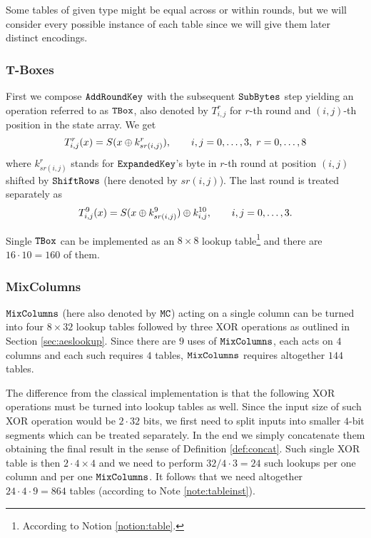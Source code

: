 \begin{note}
\label{note:tableinst}
	Some tables of given type might be equal across or within rounds, but we will consider every possible instance of each table since we will give them later distinct encodings.
\end{note}

\subsubsection{T-Boxes}
	
	First we compose $\texttt{AddRoundKey}$ with the subsequent $\texttt{SubBytes}$ step yielding an operation referred to as $\texttt{TBox}$, also denoted by $T_{i,j}^r$ for $r$-th round and $(i,j)$-th position in the state array. We get
	\begin{equation}
		T_{i,j}^r(x) = S(x\oplus k_{sr(i,j)}^r) , \qquad i,j=0 , \ldots , 3,\;r=0 , \ldots , 8
	\end{equation}
	where $k_{sr(i,j)}^r$ stands for $\texttt{ExpandedKey}$'s byte in $r$-th round at position $(i,j)$ shifted by $\texttt{ShiftRows}$ (here denoted by $sr(i,j)$). The last round is treated separately as
	\begin{equation}
	\label{eq:lasttbox}
		T_{i,j}^{9}(x) = S(x\oplus k_{sr(i,j)}^9) \oplus k_{i,j}^{10} , \qquad i,j=0 , \ldots , 3 .
	\end{equation}
	
	Single $\texttt{TBox}$ can be implemented as an $8\times 8$ lookup table\footnote{According to Notion \ref{notion:table}.} and there are $16\cdot 10 = 160$ of them.

\subsubsection{MixColumns}
	
	$\texttt{MixColumns}$ (here also denoted by $\texttt{MC}$) acting on a single column can be turned into four $8\times 32$ lookup tables followed by three XOR operations as outlined in Section \ref{sec:aeslookup}. Since there are $9$ uses of $\texttt{MixColumns}$, each acts on $4$ columns and each such requires $4$ tables, $\texttt{MixColumns}$ requires altogether $144$ tables.
	
	The difference from the classical implementation is that the following XOR operations must be turned into lookup tables as well. Since the input size of such XOR operation would be $2\cdot 32$ bits, we first need to split inputs into smaller $4$-bit segments which can be treated separately. In the end we simply concatenate them obtaining the final result in the sense of Definition \ref{def:concat}. Such single XOR table is then $2\cdot 4\times 4$ and we need to perform $32/4\cdot 3=24$ such lookups per one column and per one $\texttt{MixColumns}$. It follows that we need altogether $24\cdot 4\cdot 9 = 864$ tables (according to Note \ref{note:tableinst}).

